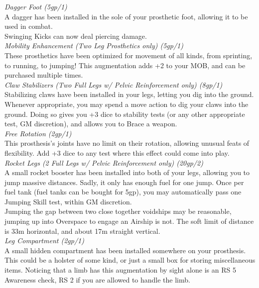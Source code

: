 \documentclass[a4paper, twocolumn, openany]{book}
\begin{document}
{	{\slshape Dagger Foot (5gp/1)\\}
	A dagger has been installed in the sole of your prosthetic foot, allowing it to be used in combat.\\
	Swinging Kicks can now deal piercing damage.\\

	{\slshape Mobility Enhancement (Two Leg Prosthetics only) (5gp/1)\\}
	These prosthetics have been optimized for movement of all kinds, from sprinting, to running, to
	jumping! This augmentation adds +2 to your MOB, and can be purchased multiple times.\\

	{\slshape Claw Stabilizers (Two Full Legs w/ Pelvic Reinforcement only) (8gp/1)\\}
	Stabilizing claws have been installed in your legs, letting you dig into the ground. Whenever
	appropriate, you may spend a move action to dig your claws into the ground. Doing so gives
	you +3 dice to stability tests (or any other appropriate test, GM discretion), and allows you to
	Brace a weapon.\\

	{\slshape Free Rotation (2gp/1)\\}
	This prosthesis’s joints have no limit on their rotation, allowing unusual feats of flexibility. Add +3
	dice to any test where this effect could come into play.\\

	{\slshape Rocket Legs (2 Full Legs w/ Pelvic Reinforcement only) (20gp/2)\\}
	A small rocket booster has been installed into both of your legs, allowing you to jump massive
	distances. Sadly, it only has enough fuel for one jump. Once per fuel tank (fuel tanks can be
	bought for 5gp), you may automatically pass one Jumping Skill test, within GM discretion.\\
	Jumping the gap between two close together voidships may be reasonable, jumping up into
	Overspace to engage an Airship is not. The soft limit of distance is 33m horizontal, and about
	17m straight vertical.\\

	{\slshape Leg Compartment (2gp/1)\\}
	A small hidden compartment has been installed somewhere on your prosthesis. This could be a
	holster of some kind, or just a small box for storing miscellaneous items. Noticing that a limb has
	this augmentation by sight alone is an RS 5 Awareness check, RS 2 if you are allowed to
	handle the limb.\\

}
\end{document}
